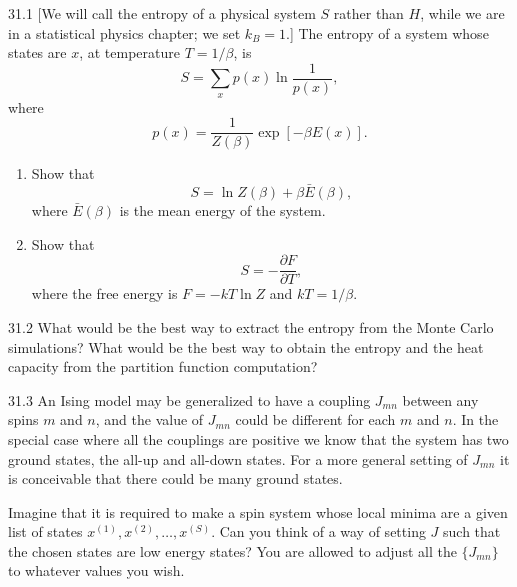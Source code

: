 \documentclass[12pt, a4paper]{article}
\begin{document}
\begin{prob}{31.1}
[We will call the entropy of a physical system $S$ rather than $H$, while we are in a statistical physics chapter; we set $k_B=1$.] The entropy of a system whose states are $x$, at temperature $T=1/\beta$, is
\[
S = \sum_x p(x)\ln \frac{1}{p(x)},
\]
where
\[
 p(x)=\frac{1}{Z(\beta)}\exp[-\beta E(x)].
\]
\begin{enumerate}
    \item[(a)] Show that
    \[
    S = \ln Z(\beta)+\beta \bar{E}(\beta),
    \]
    where $\bar{E}(\beta)$ is the mean energy of the system.
    \item[(b)] Show that
    \[
    S = -\frac{\partial F}{\partial T},
    \]
    where the free energy is $F = -kT\ln Z$ and $kT = 1/\beta$.
\end{enumerate}
\end{prob}
\begin{sol}
\end{sol}
\bigskip

\begin{prob}{31.2}
What would be the best way to extract the entropy from the Monte Carlo simulations? What would be the best way to obtain the entropy and the heat capacity from the partition function computation?
\end{prob}
\begin{sol}
\end{sol}
\bigskip

\begin{prob}{31.3}
An Ising model may be generalized to have a coupling $J_{mn}$ between any spins $m$ and $n$, and the value of $J_{mn}$ could be different for each $m$ and $n$. In the special case where all the couplings are positive we know that the system has two ground states, the all-up and all-down states. For a more general setting of $J_{mn}$ it is conceivable that there could be many ground states.

Imagine that it is required to make a spin system whose local minima are a given list of states $x^{(1)}, x^{(2)}, \ldots, x^{(S)}$. Can you think of a way of setting $J$ such that the chosen states are low energy states? You are allowed to adjust all the $\{J_{mn}\}$ to whatever values you wish.
\end{prob}
\begin{sol}
\end{sol}
\bigskip
\end{document}

